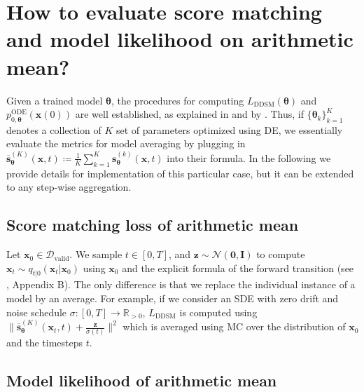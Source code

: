 \documentclass[10pt]{article} %
\newcommand{\ODE}{\text{ODE}}
\newcommand{\DDSM}{\text{DDSM}}
\newcommand{\valid}{\mathcal{D_{\mathrm{valid}}}}
\def\rvx{{\mathbf{x}}}
\def\rvz{{\mathbf{z}}}
\def\vzero{{\bm{0}}}
\def\vtheta{{\bm{\theta}}}
\def\vs{{\bm{s}}}
\def\mI{{\bm{I}}}
\newcommand{\R}{\mathbb{R}}
\begin{document}
\section{How to evaluate score matching and model likelihood on arithmetic mean?}\label{app: how to evaluate ensemble on score matching and nll}

Given a trained model $\vtheta$, the procedures for computing $L_{\DDSM}(\vtheta)$ and $p_{0,\vtheta}^{\ODE}(\rvx(0))$ are well established, as explained in  and by \citet{song2021scorebasedgenerativemodelingstochastic}. Thus, if $\{\vtheta_k \}_{k=1}^K$ denotes a collection of $K$ set of parameters optimized using DE, we essentially evaluate the metrics for model averaging by plugging in $\overline{\vs}^{(K)}_{\vtheta}(\rvx,t) \coloneqq \frac{1}{K} \sum_{k=1}^K \vs_{\vtheta}^{(k)}(\rvx,t)$ into their formula. In the following we provide details for implementation of this particular case, but it can be extended to any step-wise aggregation.

\subsection{Score matching loss of arithmetic mean} Let $\rvx_0 \in \valid$. We sample $t \in [0,T]$, and  $\rvz \sim \mathcal{N}(\vzero,\mI)$ to compute $\rvx_t \sim q_{t|0}(\rvx_t|\rvx_0)$ using $\rvx_0$ and the explicit formula of the forward transition (see \citealp{song2020generativemodelingestimatinggradients}, Appendix B). The only difference is that we replace the individual instance of a model by an average. For example, if we consider an SDE with zero drift and noise schedule $\sigma:[0,T] \rightarrow \R_{>0}$, $L_{\DDSM}$ is computed using $\| \overline{\vs}^{(K)}_{\vtheta}(\rvx_t,t) + \frac{\rvz}{\sigma(t)} \|^2$ which is averaged using MC over the distribution of $\rvx_0$ and the timesteps $t$.

\subsection{Model likelihood of arithmetic mean}
\end{document}

